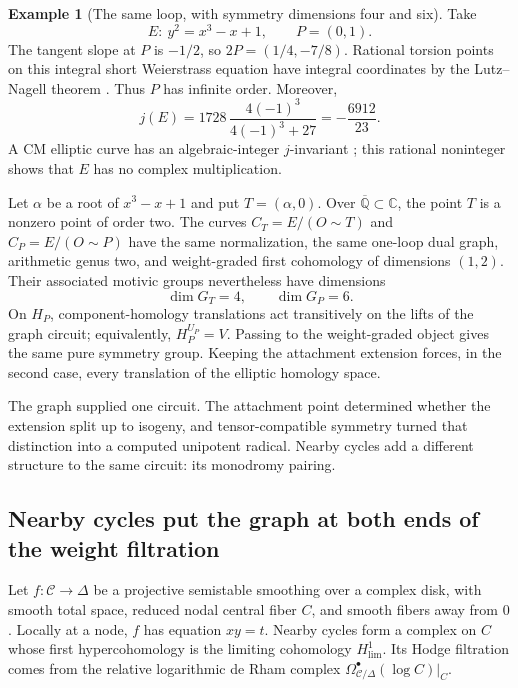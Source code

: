 \documentclass[11pt]{article}
\theoremstyle{definition}
\newtheorem{example}[theorem]{Example}
\theoremstyle{remark}
\newcommand{\Q}{\mathbb Q}
\newcommand{\C}{\mathbb C}
\begin{document}
\begin{example}[The same loop, with symmetry dimensions four and six]
\label{ex:galois-elliptic-gluing}
Take
\[
 E:\ y^2=x^3-x+1,\qquad P=(0,1).
\]
The tangent slope at $P$ is $-1/2$, so
$2P=(1/4,-7/8)$. Rational torsion points on this integral short
Weierstrass equation have integral coordinates by the Lutz--Nagell
theorem \cite[II, Theorem 5.1]{galoisMilneElliptic}.
Thus $P$ has infinite order. Moreover,
\[
 j(E)=1728\,\frac{4(-1)^3}{4(-1)^3+27}
      =-\frac{6912}{23}.
\]
A CM elliptic curve has an algebraic-integer $j$-invariant
\cite[Corollaries 12.15--12.16]{galoisMilneModular};
this rational noninteger shows that $E$ has no complex multiplication.

Let $\alpha$ be a root of $x^3-x+1$ and put $T=(\alpha,0)$.
Over $\overline{\Q}\subset\C$, the point $T$ is a nonzero point of order
two. The curves $C_T=E/(O\sim T)$ and $C_P=E/(O\sim P)$ have the same
normalization, the same one-loop dual graph, arithmetic genus two, and weight-graded
first cohomology of dimensions $(1,2)$. Their associated motivic groups
nevertheless have dimensions
\[
 \dim G_T=4,\qquad \dim G_P=6.
\]
On $H_P$, component-homology translations act transitively on the lifts
of the graph circuit; equivalently, $H_P^{U_P}=V$.
Passing to the weight-graded object gives the same pure symmetry group.
Keeping the attachment extension forces, in the second case, every
translation of the elliptic homology space.
\end{example}

The graph supplied one circuit. The attachment point determined whether
the extension split up to isogeny, and tensor-compatible symmetry turned
that distinction into a computed unipotent radical. Nearby cycles add
a different structure to the same circuit: its monodromy pairing.

\subsection{Nearby cycles put the graph at both ends of the weight filtration}
\label{sec:graph-hodge-weights}

Let $f:\mathcal C\to\Delta$ be a projective semistable smoothing over a
complex disk, with smooth total space, reduced nodal central fiber $C$,
and smooth fibers away from $0$. Locally at a node, $f$ has equation
$xy=t$. Nearby cycles form a complex on $C$ whose first hypercohomology
is the limiting cohomology $H^1_{\mathrm{lim}}$. Its Hodge filtration comes
from the relative logarithmic de Rham complex
$\Omega^\bullet_{\mathcal C/\Delta}(\log C)|_C$.
\end{document}
